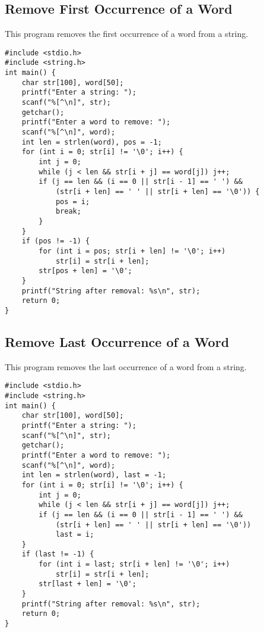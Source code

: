 \documentclass[a4paper,12pt]{article}
\begin{document}
\subsection{Remove First Occurrence of a Word}
This program removes the first occurrence of a word from a string.
\begin{lstlisting}[caption={Remove First Occurrence of a Word}]
#include <stdio.h>
#include <string.h>
int main() {
    char str[100], word[50];
    printf("Enter a string: ");
    scanf("%[^\n]", str);
    getchar();
    printf("Enter a word to remove: ");
    scanf("%[^\n]", word);
    int len = strlen(word), pos = -1;
    for (int i = 0; str[i] != '\0'; i++) {
        int j = 0;
        while (j < len && str[i + j] == word[j]) j++;
        if (j == len && (i == 0 || str[i - 1] == ' ') && 
            (str[i + len] == ' ' || str[i + len] == '\0')) {
            pos = i;
            break;
        }
    }
    if (pos != -1) {
        for (int i = pos; str[i + len] != '\0'; i++)
            str[i] = str[i + len];
        str[pos + len] = '\0';
    }
    printf("String after removal: %s\n", str);
    return 0;
}
\end{lstlisting}
\clearpage

\subsection{Remove Last Occurrence of a Word}
This program removes the last occurrence of a word from a string.
\begin{lstlisting}[caption={Remove Last Occurrence of a Word}]
#include <stdio.h>
#include <string.h>
int main() {
    char str[100], word[50];
    printf("Enter a string: ");
    scanf("%[^\n]", str);
    getchar();
    printf("Enter a word to remove: ");
    scanf("%[^\n]", word);
    int len = strlen(word), last = -1;
    for (int i = 0; str[i] != '\0'; i++) {
        int j = 0;
        while (j < len && str[i + j] == word[j]) j++;
        if (j == len && (i == 0 || str[i - 1] == ' ') && 
            (str[i + len] == ' ' || str[i + len] == '\0'))
            last = i;
    }
    if (last != -1) {
        for (int i = last; str[i + len] != '\0'; i++)
            str[i] = str[i + len];
        str[last + len] = '\0';
    }
    printf("String after removal: %s\n", str);
    return 0;
}
\end{lstlisting}
\clearpage
\end{document}
